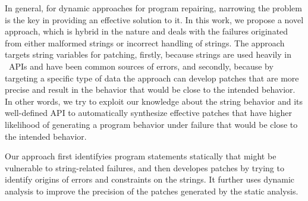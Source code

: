 In general, for dynamic approaches for program repairing, narrowing the problem
is the key in providing an effective solution to it. In this work, we propose a novel
approach, which is hybrid in the nature and
deals with the failures originated from either malformed strings or incorrect
handling of strings. The approach targets string variables for patching, firstly, because
strings are used heavily in \java\ APIs and have been common sources
of errors, and secondly, because by targeting a specific type of data
the approach can develop patches that are more precise and result in the
behavior that would be close to the intended behavior. In other words, we try to exploit our
knowledge about the string behavior and its well-defined API to automatically synthesize 
effective patches that have higher likelihood of generating a program behavior under failure that
would be close to the intended behavior.

Our approach first identifyies program statements statically
that might be vulnerable to string-related failures, and then developes patches
by trying to identify origins of errors and constraints on the strings. It further uses dynamic
analysis to improve the precision of the patches generated by the static
analysis. 


